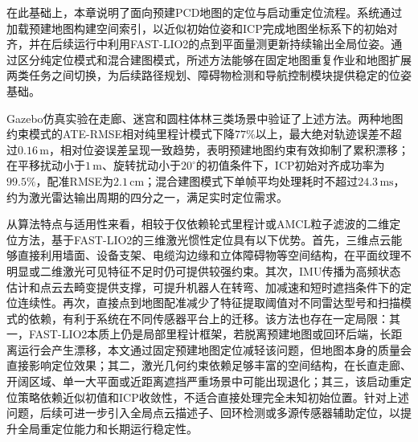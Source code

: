 在此基础上，本章说明了面向预建PCD地图的定位与启动重定位流程。系统通过加载预建地图构建空间索引，以近似初始位姿和ICP完成地图坐标系下的初始对齐，并在后续运行中利用FAST-LIO2的点到平面量测更新持续输出全局位姿。通过区分纯定位模式和混合建图模式，所述方法能够在固定地图重复作业和地图扩展两类任务之间切换，为后续路径规划、障碍物检测和导航控制模块提供稳定的位姿基础。

Gazebo仿真实验在走廊、迷宫和圆柱体林三类场景中验证了上述方法。两种地图约束模式的ATE-RMSE相对纯里程计模式下降$77\%$以上，最大绝对轨迹误差不超过$0.16\,\mathrm{m}$，相对位姿误差呈现一致趋势，表明预建地图约束有效抑制了累积漂移；在平移扰动小于$1\,\mathrm{m}$、旋转扰动小于$20^{\circ}$的初值条件下，ICP初始对齐成功率为$99.5\%$，配准RMSE为$2.1\,\mathrm{cm}$；混合建图模式下单帧平均处理耗时不超过$24.3\,\mathrm{ms}$，约为激光雷达输出周期的四分之一，满足实时定位需求。

从算法特点与适用性来看，相较于仅依赖轮式里程计或AMCL粒子滤波的二维定位方法，基于FAST-LIO2的三维激光惯性定位具有以下优势。首先，三维点云能够直接利用墙面、设备支架、电缆沟边缘和立体障碍物等空间结构，在平面纹理不明显或二维激光可见特征不足时仍可提供较强约束。其次，IMU传播为高频状态估计和点云去畸变提供支撑，可提升机器人在转弯、加减速和短时遮挡条件下的定位连续性。再次，直接点到地图配准减少了特征提取阈值对不同雷达型号和扫描模式的依赖，有利于系统在不同传感器平台上的迁移。该方法也存在一定局限：其一，FAST-LIO2本质上仍是局部里程计框架，若脱离预建地图或回环后端，长距离运行会产生漂移，本文通过固定预建地图定位减轻该问题，但地图本身的质量会直接影响定位效果；其二，激光几何约束依赖足够丰富的空间结构，在长直走廊、开阔区域、单一大平面或近距离遮挡严重场景中可能出现退化；其三，该启动重定位策略依赖近似初值和ICP收敛性，不适合直接处理完全未知初始位置。针对上述问题，后续可进一步引入全局点云描述子、回环检测或多源传感器辅助定位，以提升全局重定位能力和长期运行稳定性。
